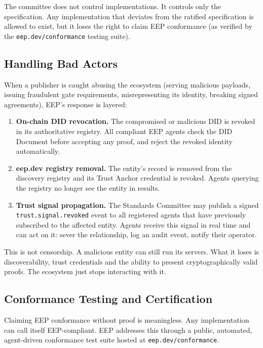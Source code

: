 \documentclass[12pt,a4paper]{article}
\begin{document}
The committee does not control implementations. It controls only the specification. Any implementation that deviates from the ratified specification is allowed to exist, but it loses the right to claim EEP conformance (as verified by the \texttt{eep.dev/conformance} testing suite).

\subsection{Handling Bad Actors}

When a publisher is caught abusing the ecosystem (serving malicious payloads, issuing fraudulent gate requirements, misrepresenting its identity, breaking signed agreements), EEP's response is layered:

\begin{enumerate}
    \item \textbf{On-chain DID revocation.} The compromised or malicious DID is revoked in its authoritative registry. All compliant EEP agents check the DID Document before accepting any proof, and reject the revoked identity automatically.
    \item \textbf{eep.dev registry removal.} The entity's record is removed from the discovery registry and its Trust Anchor credential is revoked. Agents querying the registry no longer see the entity in results.
    \item \textbf{Trust signal propagation.} The Standards Committee may publish a signed \texttt{trust.signal.revoked} event to all registered agents that have previously subscribed to the affected entity. Agents receive this signal in real time and can act on it: sever the relationship, log an audit event, notify their operator.
\end{enumerate}

This is not censorship. A malicious entity can still run its servers. What it loses is discoverability, trust credentials and the ability to present cryptographically valid proofs. The ecosystem just stops interacting with it.

\subsection{Conformance Testing and Certification}

Claiming EEP conformance without proof is meaningless. Any implementation can call itself EEP-compliant. EEP addresses this through a public, automated, agent-driven conformance test suite hosted at \texttt{eep.dev/conformance}.
\end{document}
